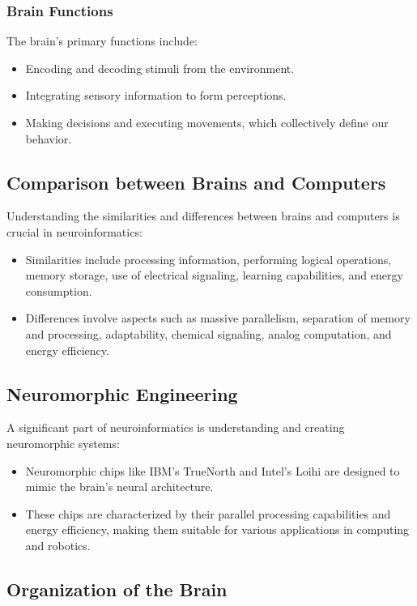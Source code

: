 \documentclass{article}
\begin{document}
\subsubsection{Brain Functions}
The brain's primary functions include:
\begin{itemize}
    \item Encoding and decoding stimuli from the environment.
    \item Integrating sensory information to form perceptions.
    \item Making decisions and executing movements, which collectively define our behavior.
\end{itemize}

\subsection{Comparison between Brains and Computers}
Understanding the similarities and differences between brains and computers is crucial in neuroinformatics:
\begin{itemize}
    \item Similarities include processing information, performing logical operations, memory storage, use of electrical signaling, learning capabilities, and energy consumption.
    \item Differences involve aspects such as massive parallelism, separation of memory and processing, adaptability, chemical signaling, analog computation, and energy efficiency.
\end{itemize}

\subsection{Neuromorphic Engineering}
A significant part of neuroinformatics is understanding and creating neuromorphic systems:
\begin{itemize}
    \item Neuromorphic chips like IBM's TrueNorth and Intel's Loihi are designed to mimic the brain's neural architecture.
    \item These chips are characterized by their parallel processing capabilities and energy efficiency, making them suitable for various applications in computing and robotics.
\end{itemize}

\subsection{Organization of the Brain}
\end{document}
